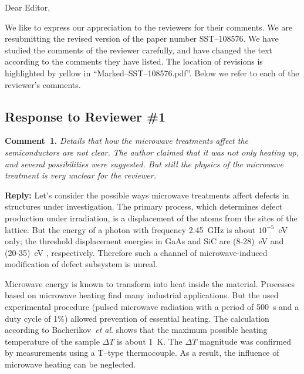 \documentclass[10pt]{iopart}
\begin{document}
Dear Editor,

We like to express our appreciation to the reviewers for their comments.
We are resubmitting the revised version of the paper number SST--108576.
We have studied the comments of the reviewer carefully, and have changed the text according to the comments they
have listed.
The location of revisions is  highlighted by yellow in ``Marked--SST--108576.pdf''.
Below we refer to each of the reviewer’s comments.



\subsection*{Response to Reviewer \#1 }

\noindent
\textcolor[rgb]{0.00,0.50,1.00}{\textbf{Comment~1.}}
\emph{Details that how the microwave treatments affect the semiconductors are not clear.
The author claimed that it was not only heating up, and several possibilities were suggested.
But still the physics of the microwave treatment is very unclear for the reviewer.}

\noindent
\textcolor[rgb]{0.51,0.00,0.00}{\textbf{Reply:}}
Let's consider the possible ways microwave treatments affect defects in structures under investigation.
The primary process, which determines defect production under irradiation,
is a displacement of the atoms from the sites of the lattice.
But the energy of a photon with frequency 2.45~GHz is about $10^{-5}$~eV only;
the threshold displacement energies in GaAs and SiC are (8-28)~eV \cite{Ed:GaAs} and (20-35)~eV \cite{Ed:SiC}, respectively.
Therefore such a channel of microwave-induced modification of defect subsystem is unreal.

Microwave energy is known to transform into heat inside the material.
Processes based on microwave heating find many industrial applications.
But the used experimental procedure
(pulsed microwave radiation with a period of 500~s and a duty cycle of 1\%)
allowed prevention of essential heating.
The calculation according to Bacherikov~\emph{et al}. \cite{Bacherikov2008En} shows that
the maximum possible heating temperature of the sample $\Delta T$ is about 1~K.
The $\Delta T$ magnitude was confirmed by measurements using a T--type thermocouple.
As a result, the influence of microwave heating can be neglected.
\end{document}
